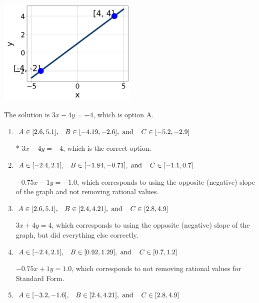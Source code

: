\documentclass{extbook}[14pt]
\begin{document}
\begin{enumerate}
{\begin{center}
    \includegraphics[width=0.5\textwidth]{../Figures/linearGraphToStandardC.png}
\end{center}


The solution is \( 3x - 4y = -4 \), which is option A.\begin{enumerate}[label=\Alph*.]
\item \( A \in [2.6, 5.1], \hspace{3mm} B \in [-4.19, -2.6], \text{ and } \hspace{3mm} C \in [-5.2, -2.9] \)

* $3x - 4y = -4$, which is the correct option.
\item \( A \in [-2.4, 2.1], \hspace{3mm} B \in [-1.84, -0.71], \text{ and } \hspace{3mm} C \in [-1.1, 0.7] \)

 $-0.75x - 1y = -1.0$, which corresponds to using the opposite (negative) slope of the graph and not removing rational values.
\item \( A \in [2.6, 5.1], \hspace{3mm} B \in [2.4, 4.21], \text{ and } \hspace{3mm} C \in [2.8, 4.9] \)

 $3x + 4y = 4$, which corresponds to using the opposite (negative) slope of the graph, but did everything else correctly.
\item \( A \in [-2.4, 2.1], \hspace{3mm} B \in [0.92, 1.29], \text{ and } \hspace{3mm} C \in [0.7, 1.2] \)

 $-0.75x + 1y = 1.0$, which corresponds to not removing rational values for Standard Form.
\item \( A \in [-3.2, -1.6], \hspace{3mm} B \in [2.4, 4.21], \text{ and } \hspace{3mm} C \in [2.8, 4.9] \)


\end{enumerate}}
\end{enumerate}
\end{document}
